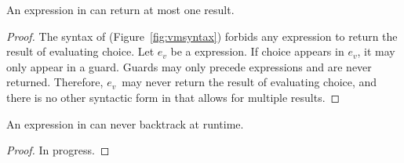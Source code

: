 \documentclass[manuscript,screen,review, 12pt, nonacm]{acmart}
\begin{document}
      \begin{lemma}
        An expression in \VMinus can return at most one result. 
      \end{lemma}

      \newcommand\ev{\ensuremath{e_{v}}\xspace}
      \begin{proof}
        The syntax of \VMinus (Figure~\ref{fig:vmsyntax}) forbids any expression
        to return the result of evaluating choice. Let \ev be a \VMinus
        expression. If choice appears in \ev, it may only appear in a guard.
        Guards may only precede expressions and are never returned. Therefore,
        \ev\ may never return the result of evaluating choice, and there is no
        other syntactic form in \VMinus that allows for multiple results. 

      \end{proof}

      \begin{lemma}
        An expression in \VMinus can never backtrack at runtime. 
      \end{lemma}
      \newcommand\gs{\ensuremath{\mathit{gs}}\xspace}
      \begin{proof}
        In progress. 
      \end{proof}

        
        

\end{document}
